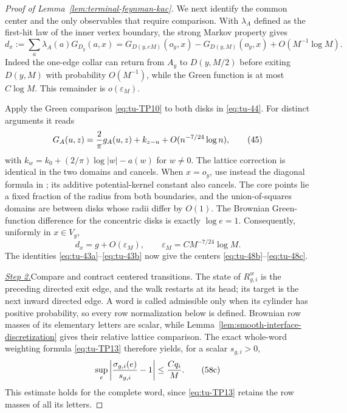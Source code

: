 \begin{proof}[Proof of Lemma~\ref{lem:terminal-feynman-kac}]
We next identify the common center and the only observables that require
comparison.  With \(\lambda_A\) defined as the first-hit law of the
inner vertex boundary, the strong Markov property gives
\begin{equation}
 d_x:=\sum_a\lambda_A(a)G_{D_y}(a,x)
 =G_{D(y,eM)}(o_y,x)-G_{D(y,M)}(o_y,x)
                  +O(M^{-1}\log M).                         \tag{44}\label{eq:tu-44}
\end{equation}
Indeed the one-edge collar can return from \(A_y\) to \(D(y,M/2)\)
before exiting \(D(y,M)\) with probability \(O(M^{-1})\), while the
Green function is at most \(C\log M\).  This remainder is
\(o(\varepsilon_M)\).

Apply the Green comparison \eqref{eq:tu-TP10} to both disks in \eqref{eq:tu-44}. For distinct
arguments it reads
\begin{equation}
 G_A(u,z)={2\over\pi}g_A(u,z)+k_{z-u}
                  +O(n^{-7/24}\log n),\tag{45}\label{eq:tu-45}
\end{equation}
with \(k_w=k_0+(2/\pi)\log|w|-a(w)\) for \(w\ne0\).
The lattice correction is identical in the two domains and cancels.
When \(x=o_y\), use instead the diagonal formula in
\cite[Theorem~1.2]{KozdronLawler2005}; its additive potential-kernel
constant also cancels. The core points lie a fixed fraction of the radius
from both boundaries, and the union-of-squares domains are between disks
whose radii differ by \(O(1)\). The Brownian Green-function difference
for the concentric disks is exactly \(\log e=1\). Consequently, uniformly
in \(x\in V_y\),
\begin{equation}
                     d_x=g+O(\varepsilon_M),
 \qquad \varepsilon_M=CM^{-7/24}\log M.                    \tag{46}\label{eq:tu-46}
\end{equation}
The identities \eqref{eq:tu-43a}--\eqref{eq:tu-43b} now give the centers \eqref{eq:tu-48b}--\eqref{eq:tu-48c}.

\smallskip\noindent
\underline{\textit{Step 2.}}\quad Compare and contract centered transitions.
The state of
\(R_{g,i}^w\) is the preceding directed exit edge, and the walk restarts at
its head; its target is the next inward directed edge.  A word is called
admissible only when its cylinder has positive probability, so every row
normalization below is defined.  Brownian row masses of its elementary
letters are scalar, while Lemma~\ref{lem:smooth-interface-discretization} gives
their relative lattice comparison.  The exact whole-word weighting formula
\eqref{eq:tu-TP13} therefore yields, for a scalar \(s_{g,i}>0\),
\begin{equation}
 \sup_e\left|{\sigma_{g,i}(e)\over s_{g,i}}-1\right|
       \le {Cq_i\over M}.                                  \tag{58c}\label{eq:tu-58c}
\end{equation}
This estimate holds for the complete word, since \eqref{eq:tu-TP13} retains the row
masses of all its letters.


\end{proof}
